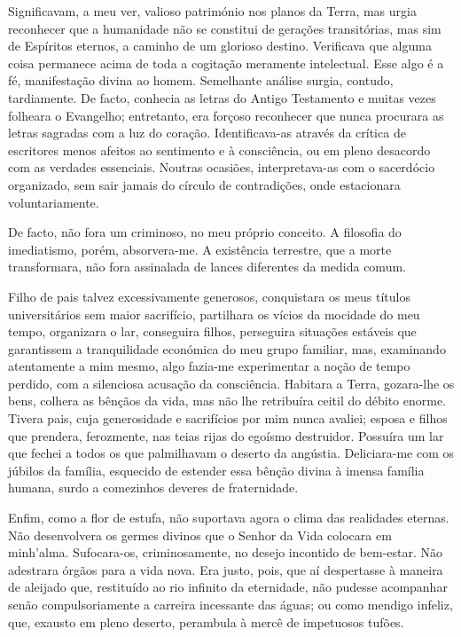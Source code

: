 \documentclass[portuguese,12pt,a4paper]{scrbook}
\begin{document}
	Significavam, a meu ver, valioso património nos planos da Terra, mas urgia reconhecer que a humanidade não se constitui de gerações transitórias, mas sim de Espíritos eternos, a caminho de um glorioso destino. Verificava que alguma coisa permanece acima de toda a cogitação meramente intelectual. Esse algo é a fé, manifestação divina ao homem. Semelhante análise surgia, contudo, tardiamente. De facto, conhecia as letras do Antigo Testamento e muitas vezes folheara o Evangelho; entretanto, era forçoso reconhecer que nunca procurara as letras sagradas com a luz do coração. Identificava-as através da crítica de escritores menos afeitos ao sentimento e à consciência, ou em pleno desacordo com as verdades essenciais. Noutras ocasiões, interpretava-as com o sacerdócio organizado, sem sair jamais do círculo de contradições, onde estacionara voluntariamente.
	
	De facto, não fora um criminoso, no meu próprio conceito. A filosofia do imediatismo, porém, absorvera-me. A existência terrestre, que a morte transformara, não fora assinalada de lances diferentes da medida comum.
	
	
	Filho de pais talvez excessivamente generosos, conquistara os meus títulos universitários sem maior sacrifício, partilhara os vícios da mocidade do meu tempo, organizara o lar, conseguira filhos, perseguira situações estáveis que garantissem a tranquilidade económica do meu grupo familiar, mas, examinando atentamente a mim mesmo, algo fazia-me experimentar a noção de tempo perdido, com a silenciosa acusação da consciência. Habitara a Terra, gozara-lhe os bens, colhera as bênçãos da vida, mas não lhe retribuíra ceitil do débito enorme. Tivera pais, cuja generosidade e sacrifícios por mim nunca avaliei; esposa e filhos que prendera, ferozmente, nas teias rijas do egoísmo destruidor. Possuíra um lar que fechei a todos os que palmilhavam o deserto da angústia. Deliciara-me com os júbilos da família, esquecido de estender essa bênção divina à imensa família humana, surdo a comezinhos deveres de fraternidade.
	
	Enfim, como a flor de estufa, não suportava agora o clima das realidades eternas. Não desenvolvera os germes divinos que o Senhor da Vida colocara em minh'alma. Sufocara-os, criminosamente, no desejo incontido de bem-estar. Não adestrara órgãos para a vida nova. Era justo, pois, que aí despertasse à maneira de aleijado que, restituído ao rio infinito da eternidade, não pudesse acompanhar senão compulsoriamente a carreira incessante das águas; ou como mendigo infeliz, que, exausto em pleno deserto, perambula à mercê de impetuosos tufões.
	
\end{document}
